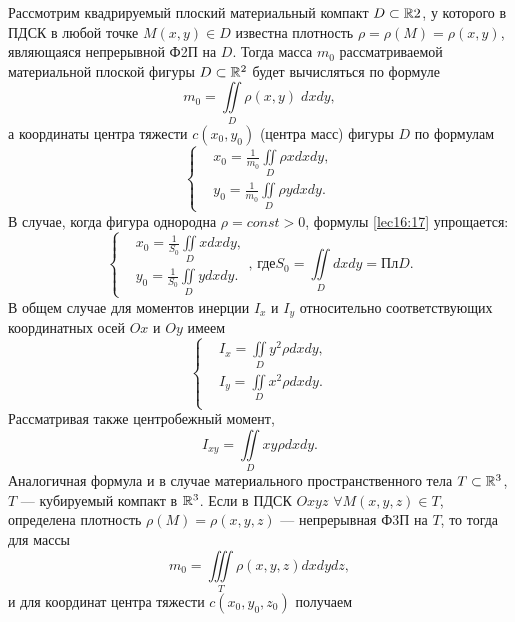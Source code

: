 \documentclass[../../main.tex]{subfiles}
\begin{document}
Рассмотрим квадрируемый плоский материальный компакт
$D \subset \mathbb{R}{2}$, у которого в ПДСК в любой точке $M(x, y) \in D$ известна
плотность $\rho = \rho(M) = \rho(x,y)$, являющаяся непрерывной Ф2П на $D$. 
Тогда
масса $m_0$ рассматриваемой материальной плоской фигуры $D \subset \mathbb{R}^{2}$
будет вычисляться по формуле
\begin{equation}
\label{lec16:15}
m_0 = \iint\limits_D \rho(x, y) \; dxdy,
\end{equation}
а координаты центра тяжести $c(x_0, y_0)$ (центра масс) фигуры $D$ по формулам
\begin{equation}
\label{lec16:16}
\begin{cases}
	&x_0 = \frac{1}{m_0}\iint\limits_D\rho x dx dy,\\
	&y_0 = \frac{1}{m_0}\iint\limits_D\rho y dx dy.
	\end{cases}
\end{equation}
В случае, когда фигура однородна $\rho=const>0$,
 формулы \ref{lec16:17} упрощается:
 \begin{equation*}
 \begin{cases}
 	&x_0 = \frac{1}{S_0}\iint\limits_D x dx dy,\\
 	&y_0 =\frac{1}{S_0}\iint\limits_D y dx dy.
 	\end{cases}
 \text{, где} S_0=\iint\limits_D dxdy=\text{Пл}D.
 \end{equation*}
В общем случае для моментов инерции $I_x$ и $I_y$ относительно соответствующих 
координатных
осей $Ox$ и $Oy$ имеем
\begin{equation}
\label{lec16:17}
\begin{cases}
	&I_x = \iint\limits_Dy^2\rho dx dy,\\
	&I_y = \iint\limits_Dx^2\rho dx dy.\\
	\end{cases}
\end{equation}
Рассматривая также центробежный момент,
\begin{equation}
\label{lec16:18}
I_{xy} = \iint\limits_Dxy\rho dx dy.
\end{equation}
Аналогичная формула и в случае материального пространственного тела
$T \subset \mathbb{R}^{3}$, $T$ --- кубируемый компакт в $\mathbb{R}^{3}$.
Если в ПДСК $Oxyz$ $\forall M(x, y, z) \in T$, определена плотность $\rho (M) =
\rho(x, y, z)$ --- непрерывная Ф3П на $T$, то тогда для массы
\begin{equation}
\label{lec16:19}
m_0 = \iiint\limits_T \rho(x, y, z) dx dy dz,
\end{equation}
и для координат центра тяжести $c(x_0, y_0, z_0)$ получаем
\end{document}
